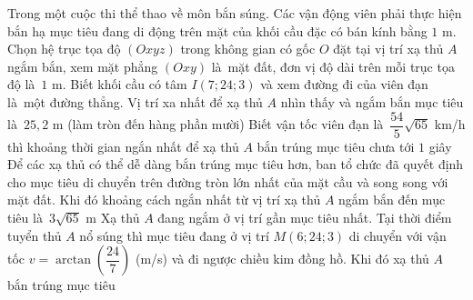 \begin{ex}%
	Trong một cuộc thi thể thao về môn bắn súng. Các vận động viên phải thực hiện bắn hạ mục tiêu đang di động trên mặt của  khối cầu đặc có bán kính bằng $1$ m. Chọn hệ trục tọa độ $(Oxyz)$ trong không gian có gốc $O$ đặt tại vị trí xạ thủ $A$ ngắm bắn, xem mặt phẳng $(Oxy)$ là~mặt đất, đơn vị độ dài trên mỗi trục tọa độ là~$1$ m. Biết khối cầu có tâm $I(7;24;3)$ và xem đường đi của viên đạn là~một đường thẳng.
	 \choiceTF
		{\True Vị trí xa nhất để xạ thủ $A$ nhìn thấy và ngắm bắn mục tiêu là~$25,2$ m (làm tròn  đến hàng phần mười)}
		{\True Biết vận tốc viên đạn là~$\dfrac{54}{5}\sqrt{65}$ km/h thì  khoảng thời gian ngắn nhất để xạ thủ $A$ bắn trúng mục tiêu chưa tới $1$ giây}
		{\True Để các xạ thủ có thể dễ dàng bắn trúng mục tiêu hơn, ban tổ chức đã quyết định cho mục tiêu di chuyển trên đường tròn lớn nhất của mặt cầu  và song song với mặt đất. Khi đó khoảng cách ngắn nhất từ vị trí xạ thủ $A$ ngắm bắn đến mục tiêu là~$3\sqrt{65}$ m}
		{\True Xạ thủ $A$ đang ngắm ở vị trí gần mục tiêu nhất. Tại thời điểm tuyển thủ $A$ nổ súng thì mục tiêu đang ở vị trí $M(6;24;3)$ di chuyển với  vận tốc $v=\arctan\left(\dfrac{24}{7}\right)$ (m/s) và đi ngược chiều kim đồng hồ. Khi đó xạ thủ $A$ bắn trúng mục tiêu}
\end{ex}
